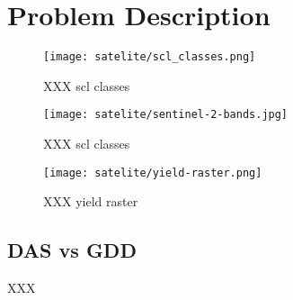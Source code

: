 \chapter{Problem Description}


\begin{figure}[h]
    \label{table:satelite/scl_classes}
    \center
    \texttt{[image: satelite/scl\_classes.png]}
    \caption{XXX scl classes}
\end{figure}

\begin{figure}[h]
    \label{fig:satelite/sentinel-2-bands}
    \center
    \texttt{[image: satelite/sentinel-2-bands.jpg]}
    \caption{XXX scl classes}
\end{figure}

\begin{figure}[h]
    \label{fig:satelite/yield-raster}
    \center
    \texttt{[image: satelite/yield-raster.png]}
    \caption{XXX yield raster}
\end{figure}



\section{DAS vs GDD}
XXX
